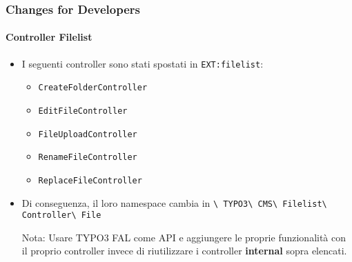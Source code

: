 
\begin{frame}[fragile]
	\frametitle{Changes for Developers}
	\framesubtitle{Controller Filelist}

	\begin{itemize}
		\item I seguenti controller sono stati spostati in \texttt{EXT:filelist}:

			\begin{itemize}\small
				\item \texttt{CreateFolderController}
				\item \texttt{EditFileController}
				\item \texttt{FileUploadController}
				\item \texttt{RenameFileController}
				\item \texttt{ReplaceFileController}
			\end{itemize}\normalsize

		\item Di conseguenza, il loro namespace cambia in\newline
			\texttt{\textbackslash
				TYPO3\textbackslash
				CMS\textbackslash
				Filelist\textbackslash
				Controller\textbackslash
				File}

		\vspace{0.2cm}

		\small
			Nota: Usare TYPO3 FAL come API e aggiungere le proprie funzionalità
			con il proprio controller invece di riutilizzare i controller \textbf{internal}
			sopra elencati.
		\normalsize

	\end{itemize}

\end{frame}


